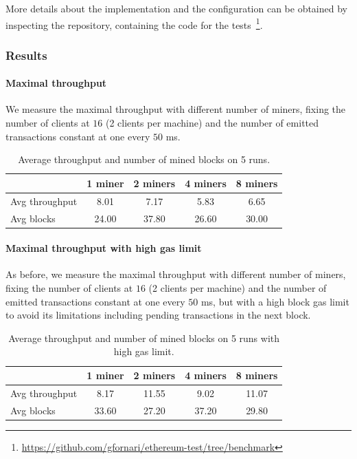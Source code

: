 More details about the implementation and the configuration can be obtained
by inspecting the repository, containing the code for the 
tests~\footnote{\url{https://github.com/gfornari/ethereum-test/tree/benchmark}}.


\subsubsection{Results}

\paragraph{Maximal throughput}
\label{sec:max-troughput}
We measure the maximal throughput with different number of miners, fixing the
number of clients at $16$ (2 clients per machine) and the number of emitted
transactions constant at one every $50$ ms. 

\begin{table}[h]
  \centering
  \begin{tabular}{lcccc}
    \hline
    & 1 miner & 2 miners & 4 miners & 8 miners \\ \hline
    Avg throughput & 8.01 & 7.17 & 5.83 & 6.65 \\ \hline
    Avg blocks & 24.00 & 37.80 & 26.60 & 30.00 \\ \hline
  \end{tabular}
  \caption{Average throughput and number of mined blocks on 5 runs.}
  \label{tab:max-troughput}
\end{table}


\paragraph{Maximal throughput with high gas limit}
\label{sec:max-throughput-high-gaslimit}
As before, we measure the maximal throughput with different number of miners,
fixing the number of clients at $16$ (2 clients per machine) and the number of
emitted transactions constant at one every $50$ ms, but with a high block gas
limit to avoid its limitations including pending transactions in the next block.

\begin{table}[h]
  \centering
  \begin{tabular}{lcccc}
    \hline
    & 1 miner & 2 miners & 4 miners & 8 miners \\ \hline
    Avg throughput & 8.17 & 11.55 & 9.02 & 11.07 \\ \hline
    Avg blocks & 33.60 & 27.20 & 37.20 & 29.80 \\ \hline
  \end{tabular}
  \caption{Average throughput and number of mined blocks on 5 runs with high gas limit.}
  \label{tab:max-troughput-high-gaslimit}
\end{table}

